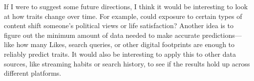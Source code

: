 \documentclass[12pt]{article}
\begin{document}
\noindent If I were to suggest some future directions, I think it would be interesting to look at how traits change over time. For example, could exposure to certain types of content shift someone's political views or life satisfaction? Another idea is to figure out the minimum amount of data needed to make accurate predictions—like how many Likes, search queries, or other digital footprints are enough to reliably predict traits. It would also be interesting to apply this to other data sources, like streaming habits or search history, to see if the results hold up across different platforms.
\end{document}
